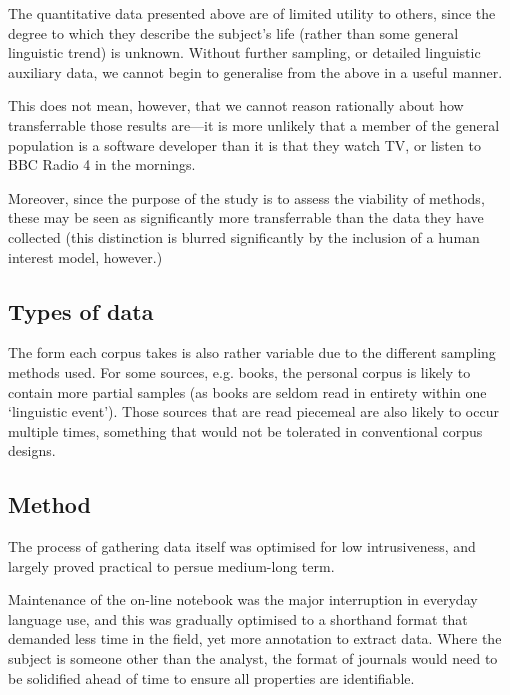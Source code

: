 

The quantitative data presented above are of limited utility to others, since the degree to which they describe the subject's life (rather than some general linguistic trend) is unknown.  Without further sampling, or detailed linguistic auxiliary data, we cannot begin to generalise from the above in a useful manner.

This does not mean, however, that we cannot reason rationally about how transferrable those results are---it is more unlikely that a member of the general population is a software developer than it is that they watch TV, or listen to BBC Radio 4 in the mornings.

Moreover, since the purpose of the study is to assess the viability of methods, these may be seen as significantly more transferrable than the data they have collected (this distinction is blurred significantly by the inclusion of a human interest model, however.)




\subsection{Types of data}
The form each corpus takes is also rather variable due to the different sampling methods used.  For some sources, e.g. books, the personal corpus is likely to contain more partial samples (as books are seldom read in entirety within one `linguistic event').  Those sources that are read piecemeal are also likely to occur multiple times, something that would not be tolerated in conventional corpus designs.




\subsection{Method}
The process of gathering data itself was optimised for low intrusiveness, and largely proved practical to persue medium-long term.

Maintenance of the on-line notebook was the major interruption in everyday language use, and this was gradually optimised to a shorthand format that demanded less time in the field, yet more annotation to extract data.  Where the subject is someone other than the analyst, the format of journals would need to be solidified ahead of time to ensure all properties are identifiable.

